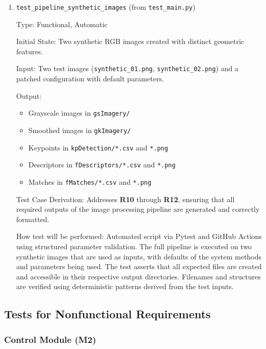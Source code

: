 \documentclass[12pt, titlepage]{article}
\begin{document}
\begin{enumerate}
\item \texttt{test\_pipeline\_synthetic\_images} \textnormal{(from \texttt{test\_main.py})}

Type: Functional, Automatic

Initial State: Two synthetic RGB images created with distinct geometric features.

Input: Two test images (\texttt{synthetic\_01.png}, \texttt{synthetic\_02.png}) and a patched configuration with default parameters.
    
Output: 
\begin{itemize}
\item Grayscale images in \texttt{gsImagery/}
\item Smoothed images in \texttt{gkImagery/}
\item Keypoints in \texttt{kpDetection/*.csv} and \texttt{*.png}
\item Descriptors in \texttt{fDescriptors/*.csv} and \texttt{*.png}
\item Matches in \texttt{fMatches/*.csv} and \texttt{*.png}
\end{itemize}

Test Case Derivation: Addresses \textbf{R10} through \textbf{R12}, ensuring that all required outputs of the image processing pipeline are generated and correctly formatted.

How test will be performed: Automated script via Pytest and GitHub Actions using structured parameter validation. The full pipeline is executed on two synthetic images that are used as inputs, with defaults of the system methods and parameters being used. The test asserts that all expected files are created and accessible in their respective output directories. Filenames and structures are verified using deterministic patterns derived from the test inputs.
\end{enumerate}


\subsection{Tests for Nonfunctional Requirements}

\subsubsection{Control Module (M2)}
\end{document}
